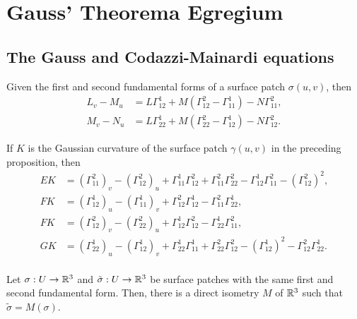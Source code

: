 \section{Gauss' Theorema Egregium}

\subsection{The Gauss and Codazzi-Mainardi equations}

\begin{proposition}
  Given the first and second fundamental forms of a surface patch
  $\sigma(u, v)$, then
  \begin{align*}
    L_v - M_u &= L \Gamma_{12}^1 + M(\Gamma_{12}^2 - \Gamma_{11}^1) - N \Gamma_{11}^2,\\
    M_v - N_u &= L \Gamma_{22}^1 + M(\Gamma_{22}^2 - \Gamma_{12}^1) - N \Gamma_{12}^2.
  \end{align*}
\end{proposition}

\begin{proposition}
  If $K$ is the Gaussian curvature of the surface patch $\gamma(u, v)$
  in the preceding proposition, then
  \begin{align*}
    EK &= (\Gamma_{11}^2)_v - (\Gamma_{12}^2)_u + \Gamma_{11}^1 \Gamma_{12}^2 +
    \Gamma_{11}^2 \Gamma_{22}^2 - \Gamma_{12}^1 \Gamma_{11}^2 - (\Gamma_{12}^2)^2, \\
    FK &= (\Gamma_{12}^1)_u - (\Gamma_{11}^1)_v + \Gamma_{12}^2 \Gamma_{12}^1 - \Gamma_{11}^2 \Gamma_{22}^1, \\
    FK &= (\Gamma_{12}^2)_v - (\Gamma_{22}^2)_u + \Gamma_{12}^1 \Gamma_{12}^2 - \Gamma_{22}^1 \Gamma_{11}^2, \\
    GK &= (\Gamma_{22}^1)_u - (\Gamma_{12}^1)_v + \Gamma_{22}^1 \Gamma_{11}^1 +
    \Gamma_{22}^2 \Gamma_{12}^2 - (\Gamma_{12}^1)^2 - \Gamma_{12}^2 \Gamma_{22}^1. \\
  \end{align*}
\end{proposition}

\begin{theorem}
  Let $\sigma: U \to \mathbb{R}^3$ and $\tilde \sigma: U \to \mathbb{R}^3$ be surface patches with the same
  first and second fundamental form. Then, there is a direct isometry $M$ of $\mathbb{R}^3$ such that $\tilde \sigma = M(\sigma)$.
\end{theorem}